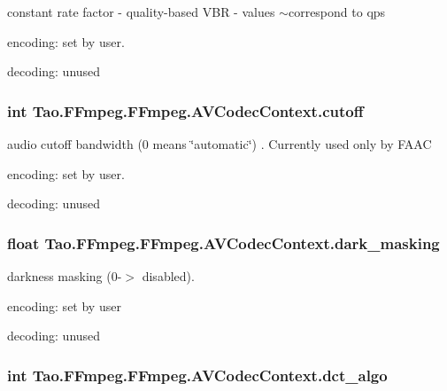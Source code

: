 \label{struct_tao_1_1_f_fmpeg_1_1_f_fmpeg_1_1_a_v_codec_context_a9218acaa887a33410f3b6dc3eb50f869}
constant rate factor -\/ quality-\/based VBR -\/ values $\sim$correspond to qps
\begin{DoxyItemize}
\item encoding: set by user.
\item decoding: unused 
\end{DoxyItemize}\hypertarget{struct_tao_1_1_f_fmpeg_1_1_f_fmpeg_1_1_a_v_codec_context_a68cc43055bcbe210160d1437411f8126}{
\subsubsection[{cutoff}]{\setlength{\rightskip}{0pt plus 5cm}int {\bf Tao.FFmpeg.FFmpeg.AVCodecContext.cutoff}}}
\label{struct_tao_1_1_f_fmpeg_1_1_f_fmpeg_1_1_a_v_codec_context_a68cc43055bcbe210160d1437411f8126}
audio cutoff bandwidth (0 means \char`\"{}automatic\char`\"{}) . Currently used only by FAAC
\begin{DoxyItemize}
\item encoding: set by user.
\item decoding: unused 
\end{DoxyItemize}\hypertarget{struct_tao_1_1_f_fmpeg_1_1_f_fmpeg_1_1_a_v_codec_context_ae2910a7716be916f36f898b38792ff63}{
\subsubsection[{dark\_\-masking}]{\setlength{\rightskip}{0pt plus 5cm}float {\bf Tao.FFmpeg.FFmpeg.AVCodecContext.dark\_\-masking}}}
\label{struct_tao_1_1_f_fmpeg_1_1_f_fmpeg_1_1_a_v_codec_context_ae2910a7716be916f36f898b38792ff63}
darkness masking (0-\/$>$ disabled).
\begin{DoxyItemize}
\item encoding: set by user
\item decoding: unused 
\end{DoxyItemize}\hypertarget{struct_tao_1_1_f_fmpeg_1_1_f_fmpeg_1_1_a_v_codec_context_afabb7149cf6dd133f2c4a3bcd45d1174}{
\subsubsection[{dct\_\-algo}]{\setlength{\rightskip}{0pt plus 5cm}int {\bf Tao.FFmpeg.FFmpeg.AVCodecContext.dct\_\-algo}}}
